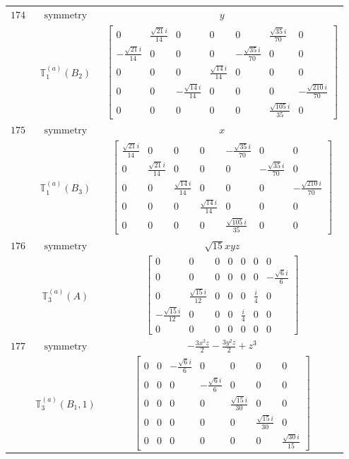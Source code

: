 \documentclass[fleqn,8pt,landscape]{jsarticle}
\begin{document}
\begin{longtable}{ccc}
$ 174 $ & $ \text{symmetry} $ & $ y $ \\
$  $ & $ \mathbb{T}_{1}^{(a)}(B_{2}) $ & $ \begin{bmatrix} 0 & \frac{\sqrt{21} i}{14} & 0 & 0 & 0 & \frac{\sqrt{35} i}{70} & 0 \\ - \frac{\sqrt{21} i}{14} & 0 & 0 & 0 & - \frac{\sqrt{35} i}{70} & 0 & 0 \\ 0 & 0 & 0 & \frac{\sqrt{14} i}{14} & 0 & 0 & 0 \\ 0 & 0 & - \frac{\sqrt{14} i}{14} & 0 & 0 & 0 & - \frac{\sqrt{210} i}{70} \\ 0 & 0 & 0 & 0 & 0 & \frac{\sqrt{105} i}{35} & 0 \end{bmatrix} $ \\ \hline
$ 175 $ & $ \text{symmetry} $ & $ x $ \\
$  $ & $ \mathbb{T}_{1}^{(a)}(B_{3}) $ & $ \begin{bmatrix} \frac{\sqrt{21} i}{14} & 0 & 0 & 0 & - \frac{\sqrt{35} i}{70} & 0 & 0 \\ 0 & \frac{\sqrt{21} i}{14} & 0 & 0 & 0 & - \frac{\sqrt{35} i}{70} & 0 \\ 0 & 0 & \frac{\sqrt{14} i}{14} & 0 & 0 & 0 & - \frac{\sqrt{210} i}{70} \\ 0 & 0 & 0 & \frac{\sqrt{14} i}{14} & 0 & 0 & 0 \\ 0 & 0 & 0 & 0 & \frac{\sqrt{105} i}{35} & 0 & 0 \end{bmatrix} $ \\ \hline
$ 176 $ & $ \text{symmetry} $ & $ \sqrt{15} x y z $ \\
$  $ & $ \mathbb{T}_{3}^{(a)}(A) $ & $ \begin{bmatrix} 0 & 0 & 0 & 0 & 0 & 0 & 0 \\ 0 & 0 & 0 & 0 & 0 & 0 & - \frac{\sqrt{6} i}{6} \\ 0 & \frac{\sqrt{15} i}{12} & 0 & 0 & 0 & \frac{i}{4} & 0 \\ - \frac{\sqrt{15} i}{12} & 0 & 0 & 0 & \frac{i}{4} & 0 & 0 \\ 0 & 0 & 0 & 0 & 0 & 0 & 0 \end{bmatrix} $ \\ \hline
$ 177 $ & $ \text{symmetry} $ & $ - \frac{3 x^{2} z}{2} - \frac{3 y^{2} z}{2} + z^{3} $ \\
$  $ & $ \mathbb{T}_{3}^{(a)}(B_{1},1) $ & $ \begin{bmatrix} 0 & 0 & - \frac{\sqrt{6} i}{6} & 0 & 0 & 0 & 0 \\ 0 & 0 & 0 & - \frac{\sqrt{6} i}{6} & 0 & 0 & 0 \\ 0 & 0 & 0 & 0 & \frac{\sqrt{15} i}{30} & 0 & 0 \\ 0 & 0 & 0 & 0 & 0 & \frac{\sqrt{15} i}{30} & 0 \\ 0 & 0 & 0 & 0 & 0 & 0 & \frac{\sqrt{30} i}{15} \end{bmatrix} $ \\ \hline

\end{longtable}
\end{document}
